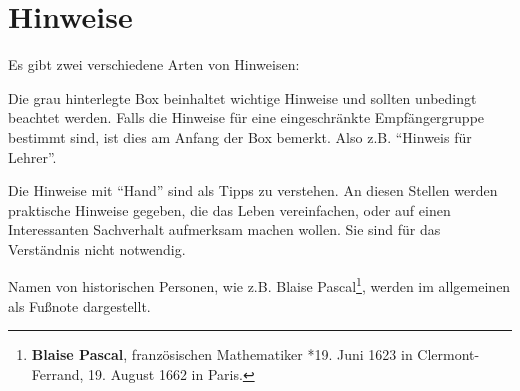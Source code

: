 \section{Hinweise}

Es gibt zwei verschiedene Arten von Hinweisen: 

\begin{svgraybox}
Die grau hinterlegte Box beinhaltet wichtige Hinweise und sollten unbedingt beachtet werden. Falls die Hinweise für eine eingeschränkte Empfängergruppe bestimmt sind, ist dies am Anfang der Box bemerkt. Also z.B. "`Hinweis für Lehrer"'. 
\end{svgraybox}

\bigskip

\HandRight \qquad Die Hinweise mit "`Hand"' sind als Tipps zu verstehen. An diesen Stellen werden praktische Hinweise gegeben, die das Leben vereinfachen, oder auf einen Interessanten Sachverhalt aufmerksam machen wollen. Sie sind für das Verständnis nicht notwendig. 

\bigskip

Namen von historischen Personen, wie z.B. Blaise Pascal\footnote{\textbf{Blaise Pascal}, französischen Mathematiker *19. Juni 1623 in Clermont-Ferrand, 19. August 1662 in Paris.}, werden im allgemeinen als Fußnote dargestellt. 
